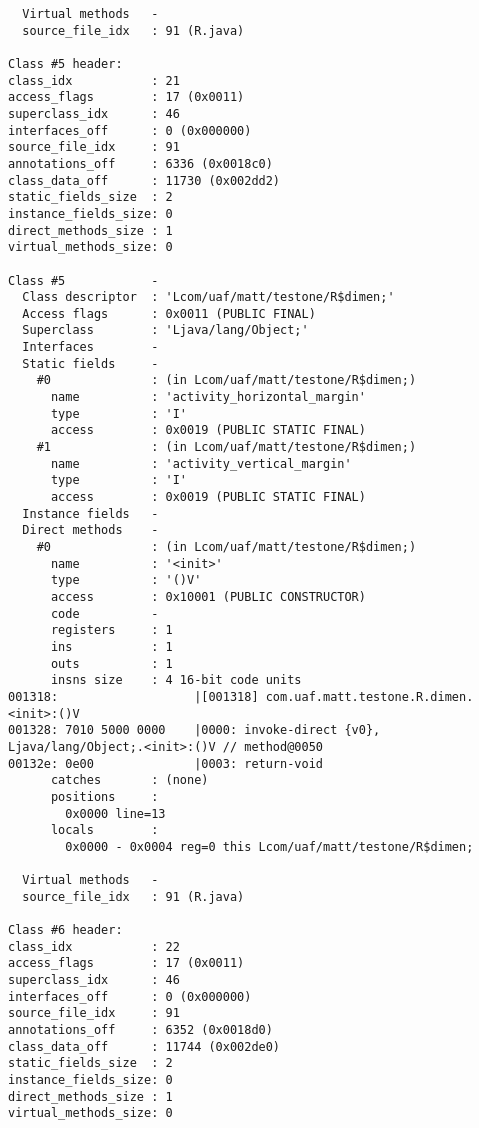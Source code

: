 \begin{lstlisting}
  Virtual methods   -
  source_file_idx   : 91 (R.java)

Class #5 header:
class_idx           : 21
access_flags        : 17 (0x0011)
superclass_idx      : 46
interfaces_off      : 0 (0x000000)
source_file_idx     : 91
annotations_off     : 6336 (0x0018c0)
class_data_off      : 11730 (0x002dd2)
static_fields_size  : 2
instance_fields_size: 0
direct_methods_size : 1
virtual_methods_size: 0

Class #5            -
  Class descriptor  : 'Lcom/uaf/matt/testone/R$dimen;'
  Access flags      : 0x0011 (PUBLIC FINAL)
  Superclass        : 'Ljava/lang/Object;'
  Interfaces        -
  Static fields     -
    #0              : (in Lcom/uaf/matt/testone/R$dimen;)
      name          : 'activity_horizontal_margin'
      type          : 'I'
      access        : 0x0019 (PUBLIC STATIC FINAL)
    #1              : (in Lcom/uaf/matt/testone/R$dimen;)
      name          : 'activity_vertical_margin'
      type          : 'I'
      access        : 0x0019 (PUBLIC STATIC FINAL)
  Instance fields   -
  Direct methods    -
    #0              : (in Lcom/uaf/matt/testone/R$dimen;)
      name          : '<init>'
      type          : '()V'
      access        : 0x10001 (PUBLIC CONSTRUCTOR)
      code          -
      registers     : 1
      ins           : 1
      outs          : 1
      insns size    : 4 16-bit code units
001318:                   |[001318] com.uaf.matt.testone.R.dimen.<init>:()V
001328: 7010 5000 0000    |0000: invoke-direct {v0}, Ljava/lang/Object;.<init>:()V // method@0050
00132e: 0e00              |0003: return-void
      catches       : (none)
      positions     :
        0x0000 line=13
      locals        :
        0x0000 - 0x0004 reg=0 this Lcom/uaf/matt/testone/R$dimen;

  Virtual methods   -
  source_file_idx   : 91 (R.java)

Class #6 header:
class_idx           : 22
access_flags        : 17 (0x0011)
superclass_idx      : 46
interfaces_off      : 0 (0x000000)
source_file_idx     : 91
annotations_off     : 6352 (0x0018d0)
class_data_off      : 11744 (0x002de0)
static_fields_size  : 2
instance_fields_size: 0
direct_methods_size : 1
virtual_methods_size: 0


\end{lstlisting}
